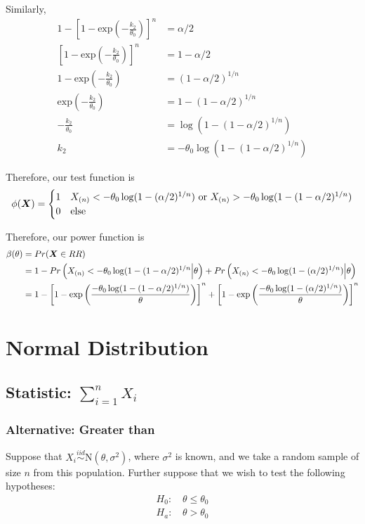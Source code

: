 \documentclass[]{article}
\newcommand{\bfX}{\mbox{\boldmath $X$}}
\begin{document}
Similarly, 
\[
\begin{split}
1 - \left[1 - \text{exp}(-\frac{k_2}{\theta_0})\right]^n &= \alpha/2 \\
\left[1 - \text{exp}(-\frac{k_2}{\theta_0})\right]^n &= 1 - \alpha/2 \\
1 - \text{exp}(-\frac{k_2}{\theta_0}) &= (1-\alpha/2)^{1/n} \\
\text{exp}(-\frac{k_2}{\theta_0}) &= 1 - (1-\alpha/2)^{1/n} \\
-\frac{k_2}{\theta_0} &= \log(1 - (1-\alpha/2)^{1/n}) \\
k_2 &= -\theta_0\log(1 - (1-\alpha/2)^{1/n})
\end{split}
\]


Therefore, our test function is
\[
\phi(\bfX) = \begin{cases}
1 & X_{(n)} < -\theta_0\log(1 - (\alpha/2)^{1/n}) \text{ or } X_{(n)} > -\theta_0\log(1 - (1-\alpha/2)^{1/n}) \\
0 & \text{else}
\end{cases}
\]

Therefore, our power function is
\[
\begin{split}
\beta(\theta) &= Pr(\bfX \in RR)  \\
&= 1 - Pr\left(X_{(n)} < -\theta_0\log(1 - (1-\alpha/2)^{1/n} \Big| \theta\right) + Pr\left(X_{(n)} < -\theta_0\log(1 - (\alpha/2)^{1/n}) \Big| \theta\right)\\
&= 1 - \left[1 - \text{exp}\left(\frac{-\theta_0\log(1 - (1-\alpha/2)^{1/n})}{\theta}\right)\right]^n + \left[1 - \text{exp}\left(\frac{-\theta_0\log(1 - (\alpha/2)^{1/n})}{\theta}\right)\right]^n
\end{split}
\]

\pagebreak

\section{Normal Distribution}

\subsection{Statistic: $\sum_{i=1}^n X_i$}

\subsubsection{Alternative: Greater than}

Suppose that $X_i \stackrel{iid}{\sim} \text{N}(\theta, \sigma^2)$, where $\sigma^2$ is known, and we take a random sample of size $n$ from this population. Further suppose that we wish to test the following hypotheses:
\[
\begin{split}
\text{$H_0$: }& \theta \leq \theta_0 \\
\text{$H_a$: }& \theta > \theta_0
\end{split}
\]
\end{document}
